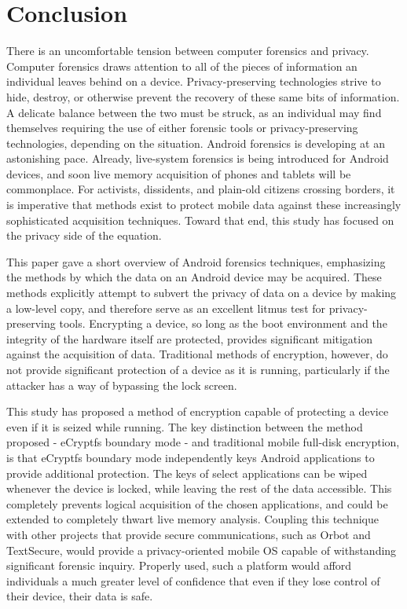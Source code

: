 \chapter{Conclusion}

There is an uncomfortable tension between computer forensics and privacy. Computer forensics draws attention to all of the pieces of
information an individual leaves behind on a device.  Privacy-preserving technologies strive to hide, destroy, or otherwise prevent
the recovery of these same bits of information. A delicate balance between the two must be struck, as an individual may find
themselves requiring the use of either forensic tools or privacy-preserving technologies, depending on the situation. 
Android forensics is developing at an astonishing pace.  Already, live-system forensics is being introduced for Android devices, and
soon live memory acquisition of phones and tablets will be commonplace. For activists, dissidents, and plain-old citizens crossing
borders, it is imperative that methods exist to protect mobile data against these increasingly sophisticated acquisition techniques.
Toward that end, this study has focused on the privacy side of the equation.

This paper gave a short overview of Android forensics techniques, emphasizing the methods by which the data
on an Android device may be acquired. These methods explicitly attempt to subvert the privacy of data on a device by making a
low-level copy, and therefore serve as an excellent litmus test for privacy-preserving tools. Encrypting a device, so long as the
boot environment and the integrity of the hardware itself are protected, provides significant mitigation against the acquisition of
data. Traditional methods of encryption, however, do not provide significant protection of a device as it is running, particularly
if the attacker has a way of bypassing the lock screen.

This study has proposed a method of encryption capable of protecting a device even if it is seized while running.  The key
distinction between the method proposed - eCryptfs boundary mode - and traditional mobile full-disk encryption, is that eCryptfs
boundary mode independently keys Android applications to provide additional protection. The keys of select applications can be wiped
whenever the device is locked, while leaving the rest of the data accessible. This completely prevents logical acquisition of the
chosen applications, and could be extended to completely thwart live memory analysis. Coupling this technique with other projects
that provide secure communications, such as Orbot and TextSecure, would provide a privacy-oriented mobile OS capable of withstanding
significant forensic inquiry. Properly used, such a platform would afford individuals a much greater level of confidence that even
if they lose control of their device, their data is safe.
